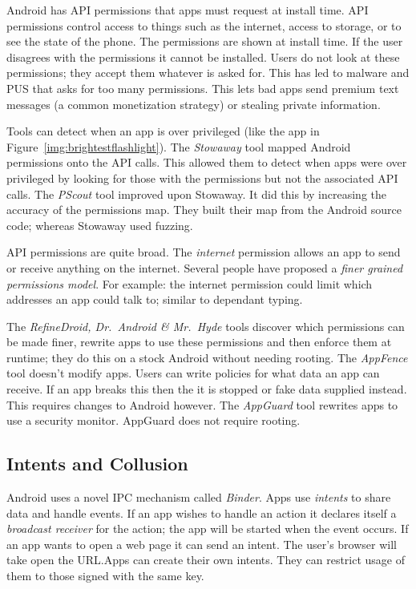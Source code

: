 \documentclass[a4paper,sfsidenotes]{tufte-book}
\begin{document}
Android has API permissions that apps must request at install time. API
permissions control access to things such as the internet, access to storage, or
to see the state of the phone. The permissions are shown at install time. If the
user disagrees with the permissions it cannot be installed. Users do not look at
these permissions; they accept them whatever is asked for\cite{Felt:2012hm}.
This has led to malware and \ac{PUS} that asks for too many permissions. This
lets bad apps send premium text messages (a common monetization
strategy\cite{Chien:2011vw}) or stealing private information.

Tools can detect when an app is over privileged (like the app in
Figure~\ref{img:brightestflashlight}). The \emph{Stowaway}
tool\cite{Felt:2011kj} mapped Android permissions onto the API calls. This
allowed them to detect when apps were over privileged by looking for those with
the permissions but not the associated API calls. The \emph{PScout}
tool\cite{Au:2012ju} improved upon Stowaway.  It did this by increasing the
accuracy of the permissions map. They built their map from the Android source
code; whereas Stowaway used fuzzing.

API permissions are quite broad. 
The \emph{internet} permission allows an app to send or receive anything on the
internet. Several people have proposed a \emph{finer grained permissions model}.
For example: the internet permission could limit which addresses an app could
talk to; similar to dependant typing.

The \emph{RefineDroid, Dr.~Android \& Mr.~Hyde} tools\cite{Jeon:2012ki} discover
which permissions can be made finer, rewrite apps to use these permissions and
then enforce them at runtime; they do this on a stock Android without needing
rooting. The \emph{AppFence} tool\cite{Hornyack:2011wq} doesn't modify apps.
Users can write policies for what data an app can receive. If an app breaks this
then the it is stopped or fake data supplied instead.  This requires changes to
Android however. The \emph{AppGuard} tool\cite{Backes:2013ec} rewrites apps to
use a security monitor. AppGuard does not require rooting.

\subsection{Intents and Collusion}

Android uses a novel IPC mechanism called \emph{Binder}. Apps use \emph{intents}
to share data and handle events. If an app wishes to handle an
 action it declares itself a \emph{broadcast receiver} for
the action; the app will be started when the event occurs.  If an app wants to
open a web page it can send an  intent. The user's browser
will take open the URL.\@ Apps can create their own intents. They can restrict
usage of them to those signed with the same key.
\end{document}
